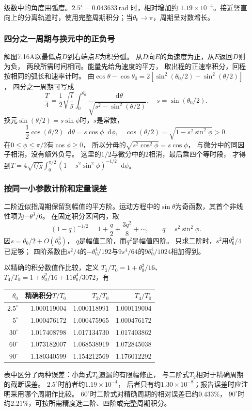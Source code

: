 \documentclass[UTF8,fontset=fandol,a4paper,11pt]{ctexart}
\newcommand{\dd}{\mathop{}\!\mathrm{d}}
\begin{document}
级数中的角度用弧度。$2.5^\circ=0.043633\,\mathrm{rad}$ 时，相对增加约 $1.19\times10^{-4}$。接近竖直向上的分离轨道时，使用完整周期积分；当$\theta_0\to\pi$，周期呈对数增长。
\subsubsection*{四分之一周期与换元中的正负号}
解图7.16A以最低点$D$到右端点$E$为积分弧。
从$D$向$E$的角速度为正，从$E$返回$D$则为负，
两段所需时间相同。能量先给角速度的平方，
取出程的正速率积分，回程按相同的弧长和速率计时。
由$\cos\theta-\cos\theta_0=
2[\sin^2(\theta_0/2)-\sin^2(\theta/2)]$，
四分之一周期可写成
\[
\frac T4=\frac12\sqrt{\frac lg}
\int_0^{\theta_0}\frac{\dd\theta}{\sqrt{s^2-\sin^2(\theta/2)}},
\quad s=\sin(\theta_0/2).
\]
换元$\sin(\theta/2)=s\sin\phi$时，$s$是常数，
\[
\frac12\cos(\theta/2)\dd\theta=s\cos\phi\dd\phi,
\quad \cos(\theta/2)=\sqrt{1-s^2\sin^2\phi}>0.
\]
在$0\le\phi\le\pi/2$有$\cos\phi\ge0$，
所以分母的$\sqrt{s^2\cos^2\phi}=s\cos\phi$，
与微分中的同因子相消，没有额外负号。
这里的$1/2$与微分中的2相消，最后乘四个等时段，
才得到$T=4\sqrt{l/g}\int_0^{\pi/2}(1-s^2\sin^2\phi)^{-1/2}\dd\phi$。

\subsubsection*{按同一小参数计阶和定量误差}
二阶近似指周期保留到幅值的平方阶。运动方程中的$\sin\theta$为奇函数，其首个非线性项为$-\theta^3/6$。
在固定积分区间内，取
\[
(1-q)^{-1/2}=1+\frac q2+\frac{3q^2}{8}+\cdots,
\qquad q=s^2\sin^2\phi.
\]
因$s=\theta_0/2+O(\theta_0^3)$，
$q$是幅值二阶，而$q^2$是幅值四阶。
只求二阶时，$s^2$用$\theta_0^2/4$已足够；
四阶系数由$s^2/4$的$-\theta_0^4/192$与$9s^4/64$的$9\theta_0^4/1024$相加得到。

以精确的积分数值作比较，定义
$T_2/T_0=1+\theta_0^2/16$、
$T_4/T_0=1+\theta_0^2/16+11\theta_0^4/3072$，有
\begin{center}\begin{tabular}{r|rrr}
$\theta_0$&精确积分$T/T_0$&$T_2/T_0$&$T_4/T_0$\\\hline
$2.5^\circ$&1.000119004&1.000118991&1.000119004\\
$5^\circ$&1.000476172&1.000475965&1.000476172\\
$30^\circ$&1.017408798&1.017134730&1.017403862\\
$60^\circ$&1.073182007&1.068538919&1.072845038\\
$90^\circ$&1.180340599&1.154212569&1.176012292\\
\end{tabular}\end{center}
表中区分了两种误差：小角式$T_0$遗漏的有限幅修正，
与二阶式$T_2$相对于精确周期的截断误差。
$2.5^\circ$时前者约$1.19\times10^{-4}$，
后者只有约$1.30\times10^{-8}$；报告误差时应注明采用哪个周期作比较。
$60^\circ$时二阶式对精确周期的相对误差已约$0.433\%$，
$90^\circ$时约$2.21\%$，可按所需精度选二阶、四阶或完整周期积分。
\end{document}
